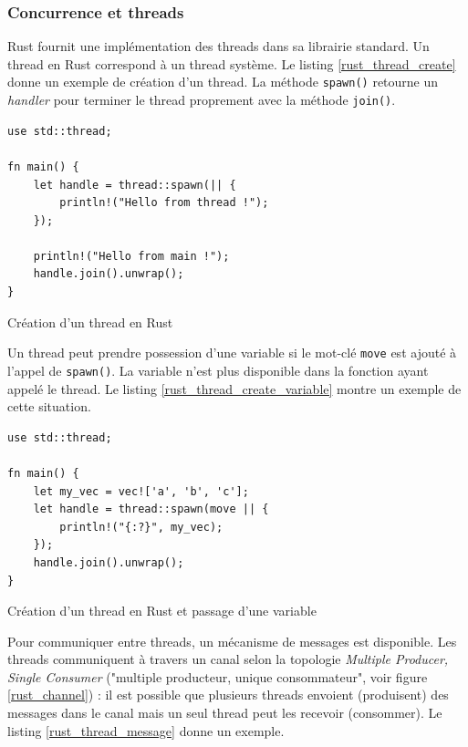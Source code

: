 \subsubsection{Concurrence et threads}
Rust fournit une implémentation des threads dans sa librairie standard. Un thread en Rust 
correspond à un thread système. Le listing \ref{rust_thread_create} donne un exemple de création 
d'un thread. La méthode \texttt{spawn()} retourne un \textit{handler} pour terminer le 
thread proprement avec la méthode \texttt{join()}.
\bigbreak
\begin{code}
    \begin{verbatim}
use std::thread;

fn main() {
    let handle = thread::spawn(|| {
        println!("Hello from thread !");
    });
    
    println!("Hello from main !");
    handle.join().unwrap();
}
    \end{verbatim}
    \caption{Création d'un thread en Rust}
    \label{rust_thread_create}
\end{code}
\bigbreak
Un thread peut prendre possession d'une variable si le mot-clé \texttt{move} est ajouté à 
l'appel de \texttt{spawn()}. La variable n'est plus disponible dans la fonction ayant 
appelé le thread. Le listing \ref{rust_thread_create_variable} montre un exemple de cette situation.
\bigbreak
\begin{code}
    \begin{verbatim}
use std::thread;

fn main() {
    let my_vec = vec!['a', 'b', 'c'];
    let handle = thread::spawn(move || {
        println!("{:?}", my_vec);
    });
    handle.join().unwrap();
}
    \end{verbatim}
    \caption{Création d'un thread en Rust et passage d'une variable}
    \label{rust_thread_create_variable}
\end{code}
\bigbreak
Pour communiquer entre threads, un mécanisme de messages est disponible. Les threads communiquent à 
travers un canal selon la topologie \textit{Multiple Producer, Single Consumer} ("multiple producteur, 
unique consommateur", voir figure \ref{rust_channel}) : il est possible que plusieurs threads 
envoient (produisent) des messages dans le canal mais un seul thread peut les recevoir (consommer). 
Le listing \ref{rust_thread_message} donne un exemple.
